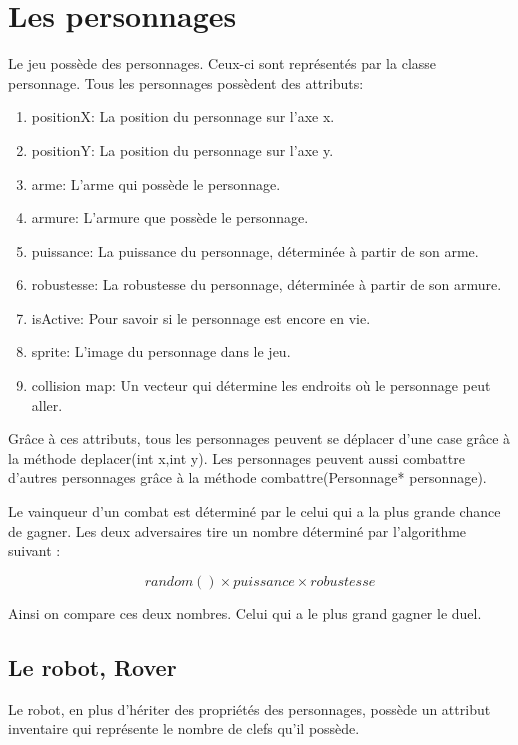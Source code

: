 \documentclass[a4paper 12pts]{article}
\begin{document}
\section{Les personnages}
Le jeu possède des personnages. Ceux-ci sont représentés par la classe personnage. Tous les personnages possèdent des attributs:
\begin{enumerate}
	\item positionX: La position du personnage sur l'axe x.
	\item positionY: La position du personnage sur l'axe y.
	\item arme: L'arme qui possède le personnage.
	\item armure: L'armure que possède le personnage.
	\item puissance: La puissance du personnage, déterminée à partir de son arme.
	\item robustesse: La robustesse du personnage, déterminée à partir de son armure.
	\item isActive: Pour savoir si le personnage est encore en vie.
	\item sprite: L'image du personnage dans le jeu.
	\item collision map: Un vecteur qui détermine les endroits où le personnage peut aller.
\end{enumerate}

Grâce à ces attributs, tous les personnages peuvent se déplacer d'une case grâce à la méthode deplacer(int x,int y). Les personnages peuvent aussi combattre d'autres personnages grâce à la méthode combattre(Personnage* personnage).

Le vainqueur d'un combat est déterminé par le celui qui a la plus grande chance de gagner. Les deux adversaires tire un nombre déterminé par l'algorithme suivant :

\begin{equation}
    random() \times puissance \times robustesse 
    \label{combat}
\end{equation}

Ainsi on compare ces deux nombres. Celui qui a le plus grand gagner le duel.

\subsection{Le robot, Rover}

Le robot, en plus d'hériter des propriétés des personnages, possède un attribut inventaire qui représente le nombre de clefs qu'il possède.
\end{document}
